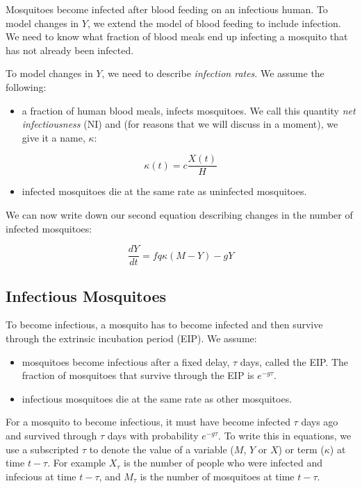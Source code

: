 \documentclass[
]{book}
\providecommand{\tightlist}{%
  \setlength{\itemsep}{0pt}\setlength{\parskip}{0pt}}
\begin{document}
Mosquitoes become infected after blood feeding on an infectious human. To model changes in \(Y\), we extend the model of blood feeding to include infection. We need to know what fraction of blood meals end up infecting a mosquito that has not already been infected.

To model changes in \(Y\), we need to describe \emph{infection rates}. We assume the following:

\begin{itemize}
\tightlist
\item
  a fraction of human blood meals, infects mosquitoes. We call this quantity \emph{net infectiousness} (NI) and (for reasons that we will discuss in a moment), we give it a name, \(\kappa\):
\end{itemize}

\begin{equation}
\kappa(t) = c \frac{X(t)}{H}
\label{eq:kappaDef}
\end{equation}

\begin{itemize}
\tightlist
\item
  infected mosquitoes die at the same rate as uninfected mosquitoes.
\end{itemize}

We can now write down our second equation describing changes in the number of infected mosquitoes:

\begin{equation}
\frac{dY}{dt} = f q \kappa (M-Y) -g Y
\end{equation}

\subsection{Infectious Mosquitoes}\label{infectious-mosquitoes}

To become infectious, a mosquito has to become infected and then survive through the extrinsic incubation period (EIP). We assume:

\begin{itemize}
\item
  mosquitoes become infectious after a fixed delay, \(\tau\) days, called the EIP. The fraction of mosquitoes that survive through the EIP is \(e^{-g \tau}\).
\item
  infectious mosquitoes die at the same rate as other mosquitoes.
\end{itemize}

For a mosquito to become infectious, it must have become infected \(\tau\) days ago and survived through \(\tau\) days with probability \(e^{-g\tau}\). To write this in equations, we use a subscripted \(\tau\) to denote the value of a variable (\(M\), \(Y\) or \(X\)) or term (\(\kappa\)) at time \(t-\tau\). For example \(X_\tau\) is the number of people who were infected and infecious at time \(t-\tau\), and \(M_\tau\) is the number of mosquitoes at time \(t-\tau\).
\end{document}
